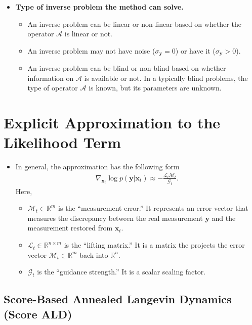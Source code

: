 \documentclass[10pt]{article}
\newcommand{\ve}[1]{\mathbf{#1}}
\newcommand{\mcal}[1]{\mathcal{#1}}
\newcommand{\Real}{\mathbb{R}}
\begin{document}
\begin{itemize}
\begin{itemize}
    \item {\bf Type of inverse problem the method can solve.}
    \begin{itemize}
      \item An inverse problem can be linear or non-linear based on whether the operator $\mcal{A}$ is linear or not.
      \item An inverse problem may not have noise ($\sigma_{\ve{y}} = 0$) or have it ($\sigma_{\ve{y}} > 0$).
      \item An inverse problem can be blind or non-blind based on whether information on $\mcal{A}$ is available or not. In a typically blind problems, the type of operator $\mcal{A}$ is known, but its parameters are unknown.
    \end{itemize}
  \end{itemize}
\end{itemize}

\section{Explicit Approximation to the Likelihood Term}

\begin{itemize}
  \item In general, the approximation has the following form
  \begin{align*}
    \nabla_{\ve{x}_t} \log p(\ve{y}|\ve{x}_t) \approx -\frac{\mcal{L}_t \mcal{M}_t}{\mcal{G}_t}.
  \end{align*}
  Here,
  \begin{itemize}
    \item $\mcal{M}_t \in \Real^m$ is the ``measurement error.'' It represents an error vector that measures the discrepancy between the real measurement $\ve{y}$ and the measurement restored from $\ve{x}_t$.
    \item $\mcal{L}_t \in \Real^{n \times m}$ is the ``lifting matrix.'' It is a matrix the projects the error vector $\mcal{M}_t \in \Real^m$ back into $\Real^n$.
    \item $\mcal{G}_t$ is the ``guidance strength.'' It is a scalar scaling factor.
  \end{itemize}  
\end{itemize}

\subsection{Score-Based Annealed Langevin Dynamics (Score ALD)}
\end{document}
